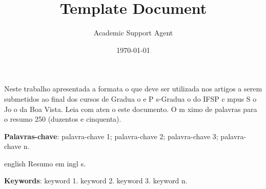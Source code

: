 \documentclass{article}
\title{Template Document}
\author{Academic Support Agent}
\date{\today}
\begin{document}
\maketitle

	
	\frenchspacing 
	
	
    
	\maketitle
    
	\begin{resumoumacoluna}
		
		Neste trabalho   apresentada a formata o que deve ser utilizada nos artigos a serem submetidos ao final dos cursos de Gradua o e P s-Gradua o do IFSP c mpus S o Jo o da Boa Vista. Leia com aten o este documento. O m ximo de palavras para o resumo   250 (duzentos e cinquenta). 
		
		\vspace{\onelineskip}
		
        \textbf{Palavras-chave}: palavra-chave 1; palavra-chave 2; palavra-chave 3; palavra-chave n.
		
	\end{resumoumacoluna}
	
    \renewcommand{\resumoname}{Abstract}
    \begin{resumoumacoluna}
    	
        \begin{otherlanguage*}{english}
   	    	Resumo em ingl s.
   		
       		\vspace{\onelineskip}
   		
   	    	\noindent
   	    	\textbf{Keywords}: keyword 1. keyword 2. keyword 3. keyword n.
   		   
      \end{otherlanguage*} 
  
   	\end{resumoumacoluna}
        
\end{document}
